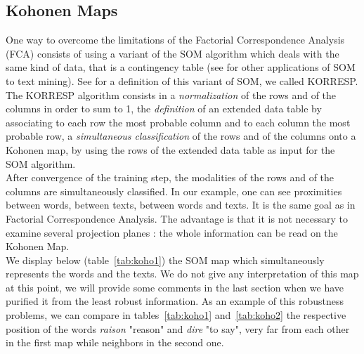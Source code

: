 \documentclass{elsarticle}
\begin{document}
\subsection{Kohonen Maps}

One way to overcome the limitations of the Factorial Correspondence Analysis (FCA) consists of using a variant of the SOM algorithm which deals with the same kind of data, that is a contingency table (see \cite{oja99} for other applications of SOM to text mining). See \cite{cottrell98} for a definition of this variant of SOM, we called KORRESP.\\

The KORRESP algorithm consists in a \textit{normalization} of the rows and of the columns in order to sum to 1, the \textit{definition} of an extended data table by associating to each row the most probable column and to each column the most probable row, a \textit{simultaneous classification} of the rows and of the columns onto a Kohonen map, by using the rows of the extended data table as input for the SOM algorithm.\\

After convergence of the training step, the modalities of the rows and of the columns are simultaneously classified. In our example, one can see proximities between words, between texts, between words and texts. It is the same goal as in Factorial Correspondence Analysis. The advantage is that it is not necessary to examine several projection planes : the whole information can be read on the Kohonen Map.\\

We display below (table~\ref{tab:koho1}) the SOM map which simultaneously represents the words and the texts. %
We do not give any interpretation of this map at this point, we will provide some comments in the last section when we have purified it from the least robust information. As an example of this robustness problems, we can compare in tables~\ref{tab:koho1} and~\ref{tab:koho2} the respective position of the words \textit{raison} "reason" and \textit{dire} "to say", very far from each other in the first map while neighbors in the second one.\\

\setlength{\tabcolsep}{1mm}
\setlength{\arrayrulewidth}{1pt}
\end{document}
